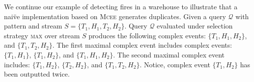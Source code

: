 \begin{example}\label{example:3}
  We continue our example of detecting fires in a warehouse to illustrate that a nai\"ve implementation based on \textsc{Mcee} generates duplicates. Given a query $\mathcal{Q}$ with pattern  and stream $S = \{ T_{1}, H_{1}, T_{2}, H_{2}\}$. Query $\mathcal{Q}$ evaluated under selection strategy \textsc{max} over stream $S$ produces the following complex events: $\{T_{1}, H_{1}, H_{2}\}$, and $\{T_{1}, T_{2}, H_{2}\}$. The first maximal complex event includes complex events: $\{T_{1}, H_{1}\}$, $\{T_{1}, H_{2}\}$, and $\{T_{1}, H_{1}, H_{2}\}$. The second maximal complex event includes: $\{T_{1}, H_{2}\}$, $\{T_{2}, H_{2}\}$, and $\{T_{1}, T_{2}, H_{2}\}$. Notice, complex event $\{T_{1}, H_{2}\}$ has been outputted twice.
\end{example}

























